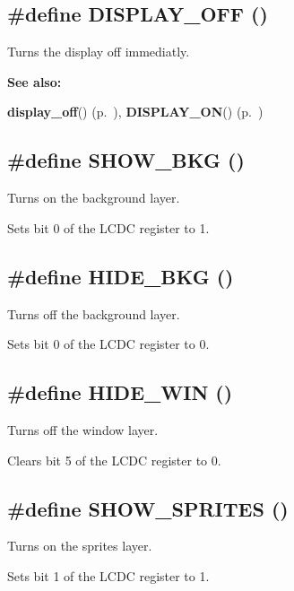 \subsection{\setlength{\rightskip}{0pt plus 5cm}\#define DISPLAY\_\-OFF ()}

Turns the display off immediatly.

\begin{Desc}
\item[{\bf See also: }]\par
{\bf display\_\-off}() {\rm (p.~\pageref{gb.h_a76})}, {\bf DISPLAY\_\-ON}() {\rm (p.~\pageref{gb.h_a43})} \end{Desc}
\label{gb.h_a45}
\subsection{\setlength{\rightskip}{0pt plus 5cm}\#define SHOW\_\-BKG ()}

Turns on the background layer.

Sets bit 0 of the LCDC register to 1. \label{gb.h_a46}
\subsection{\setlength{\rightskip}{0pt plus 5cm}\#define HIDE\_\-BKG ()}

Turns off the background layer.

Sets bit 0 of the LCDC register to 0. \label{gb.h_a48}
\subsection{\setlength{\rightskip}{0pt plus 5cm}\#define HIDE\_\-WIN ()}

Turns off the window layer.

Clears bit 5 of the LCDC register to 0. \label{gb.h_a49}
\subsection{\setlength{\rightskip}{0pt plus 5cm}\#define SHOW\_\-SPRITES ()}

Turns on the sprites layer.

Sets bit 1 of the LCDC register to 1. \label{gb.h_a50}
